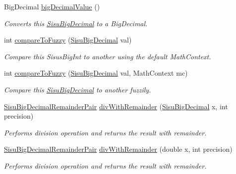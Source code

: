 \begin{DoxyCompactItemize}
Big\+Decimal \hyperlink{classcom_1_1aarrelaakso_1_1drawl_1_1_sisu_big_decimal_a48686473be6df9038c67d2cefa26c311}{big\+Decimal\+Value} ()
\begin{DoxyCompactList}\small\item\em Converts this \hyperlink{classcom_1_1aarrelaakso_1_1drawl_1_1_sisu_big_decimal}{Sisu\+Big\+Decimal} to a Big\+Decimal. \end{DoxyCompactList}\item 
int \hyperlink{classcom_1_1aarrelaakso_1_1drawl_1_1_sisu_big_decimal_a9a7c6100961355b8acb1dbcb40197136}{compare\+To\+Fuzzy} (\hyperlink{classcom_1_1aarrelaakso_1_1drawl_1_1_sisu_big_decimal}{Sisu\+Big\+Decimal} val)
\begin{DoxyCompactList}\small\item\em Compare this Sisus\+Big\+Int to another using the default Math\+Context. \end{DoxyCompactList}\item 
int \hyperlink{classcom_1_1aarrelaakso_1_1drawl_1_1_sisu_big_decimal_a2914bed4a69adb928d6edb2af9d578d4}{compare\+To\+Fuzzy} (\hyperlink{classcom_1_1aarrelaakso_1_1drawl_1_1_sisu_big_decimal}{Sisu\+Big\+Decimal} val, Math\+Context mc)
\begin{DoxyCompactList}\small\item\em Compare this \hyperlink{classcom_1_1aarrelaakso_1_1drawl_1_1_sisu_big_decimal}{Sisu\+Big\+Decimal} to another fuzzily. \end{DoxyCompactList}\item 
\hyperlink{classcom_1_1aarrelaakso_1_1drawl_1_1_sisu_big_decimal_remainder_pair}{Sisu\+Big\+Decimal\+Remainder\+Pair} \hyperlink{classcom_1_1aarrelaakso_1_1drawl_1_1_sisu_big_decimal_a21e09234efca516798b5bd745fccad41}{div\+With\+Remainder} (\hyperlink{classcom_1_1aarrelaakso_1_1drawl_1_1_sisu_big_decimal}{Sisu\+Big\+Decimal} x, int precision)
\begin{DoxyCompactList}\small\item\em Performs division operation and returns the result with remainder. \end{DoxyCompactList}\item 
\hyperlink{classcom_1_1aarrelaakso_1_1drawl_1_1_sisu_big_decimal_remainder_pair}{Sisu\+Big\+Decimal\+Remainder\+Pair} \hyperlink{classcom_1_1aarrelaakso_1_1drawl_1_1_sisu_big_decimal_a8707dfd3e59cee5e599d6a8a469b7f0d}{div\+With\+Remainder} (double x, int precision)
\begin{DoxyCompactList}\small\item\em Performs division operation and returns the result with remainder. \end{DoxyCompactList}\item 

\end{DoxyCompactItemize}
